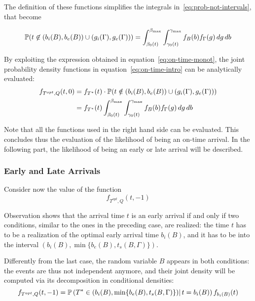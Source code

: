 The definition of these functions simplifies the integrals in~\eqref{eq:prob-not-intervals}, that become

\begin{equation}
  \label{eq:on-time-monot}
  \mathbb{P}( t \not\in (b_i(B), b_e(B)) \cup (g_i(\Gamma), g_e(\Gamma))) = \int_{\beta_0(t)}^{\beta_{\text{max}}}\int_{\gamma_0(t)}^{\gamma_{\text{max}}}f_B(b)f_\Gamma(g)\, dg\, db
\end{equation}

By exploiting the expression obtained in equation~\eqref{eq:on-time-monot},
the joint probability density functions in equation~\eqref{eq:on-time-intro} can be analytically evaluated:
\begin{equation}
  \label{eq:on-time-final}
  \begin{split}
    f_{T^{opt}, Q}(t, 0) & = f_{T^*}(t) \cdot \mathbb{P}(t \notin (b_i(B), b_e(B)) \cup (g_i(\Gamma), g_e(\Gamma))) \\
    & = f_{T^*}(t)\int_{\beta_0(t)}^{\beta_{\text{max}}}\int_{\gamma_0(t)}^{\gamma_{\text{max}}}f_B(b)f_\Gamma(g)\, dg\, db
  \end{split}
\end{equation}

Note that all the functions used in the right hand side can be evaluated.
This concludes thus the evaluation of the likelihood of being an on-time arrival.
In the following part, the likelihood of being an early or late arrival will be described.

\subsubsection{Early and Late Arrivals}

Consider now the value of the function
\begin{equation*}
  f_{T^{opt}, Q}(t, -1)
\end{equation*}

Observation shows that the arrival time \(t\) is an early arrival if and only if two conditions,
similar to the ones in the preceding case,
are realized:
the time \(t\) has to be a realization of the optimal early arrival time \(b_i(B)\),
and it has to be into the interval \((b_i(B), \min\{b_e(B), t_s(B, \Gamma)\})\).

Differently from the last case, the random variable \(B\) appears in both conditions:
the events are thus not independent anymore,
and their joint density will be computed via its decomposition in conditional densities:
\begin{equation}
  \label{eq:late-joint-decomp}
  f_{T^{opt}, Q}(t, -1) = \mathbb{P}\left(T^* \in (b_i(B), \min\{b_e(B), t_s(B, \Gamma)\})|\, t = b_i(B)\right) f_{b_i(B)}(t)
\end{equation}

